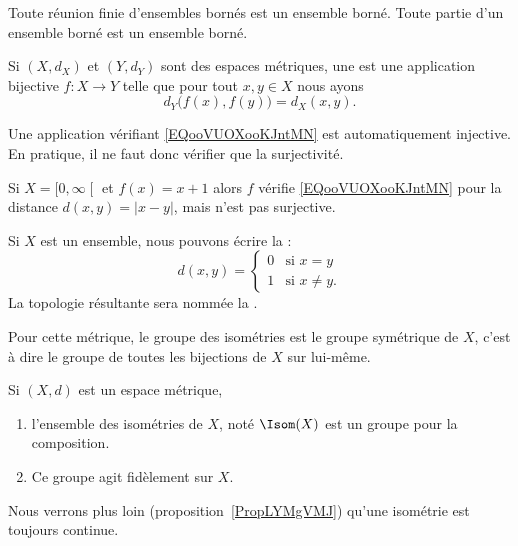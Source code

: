 \begin{proposition}
  Toute réunion finie d'ensembles bornés est un ensemble borné. Toute partie d'un ensemble borné est un ensemble borné.
\end{proposition}

\begin{definition}
    Si \( (X,d_X)\) et \( (Y,d_Y)\) sont des espaces métriques, une  est une application bijective \( f\colon X\to Y\) telle que pour tout \( x,y\in X\) nous ayons
    \begin{equation}        \label{EQooVUOXooKJntMN}
        d_Y\big( f(x),f(y) \big)=d_X(x,y).
    \end{equation}
\end{definition}

\begin{remark}
    Une application vérifiant \eqref{EQooVUOXooKJntMN} est automatiquement injective. En pratique, il ne faut donc vérifier que la surjectivité.
\end{remark}

\begin{example}
    Si \( X=\mathopen[ 0 , \infty \mathclose[\) et \( f(x)=x+1\) alors \( f\) vérifie \eqref{EQooVUOXooKJntMN} pour la distance \( d(x,y)=| x-y |\), mais n'est pas surjective.
\end{example}

\begin{example}
    Si \( X\) est un ensemble, nous pouvons écrire la  :
    \begin{equation}
        d(x,y)=\begin{cases}
            0    &   \text{si } x=y\\
            1    &    \text{si } x\neq y\text{.}
        \end{cases}
    \end{equation}
    La topologie résultante sera nommée la .

    Pour cette métrique, le groupe des isométries est le groupe symétrique de \( X\), c'est à dire le groupe de toutes les bijections de \( X\) sur lui-même.
\end{example}

\begin{propositionDef}
    Si \( (X,d)\) est un espace métrique,
    \begin{enumerate}
        \item
            l'ensemble des isométries de \( X\), noté \( \Isom(X)\) est un groupe pour la composition.
        \item
            Ce groupe agit fidèlement sur \( X\).
    \end{enumerate}
\end{propositionDef}
Nous verrons plus loin (proposition~\ref{PropLYMgVMJ}) qu'une isométrie est toujours continue.

